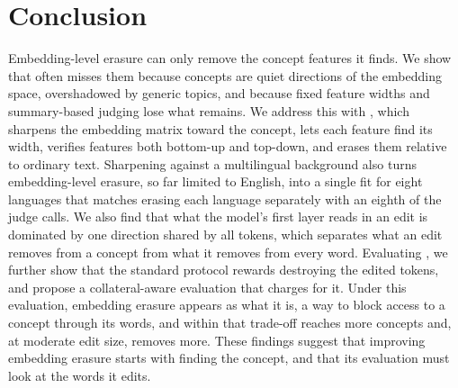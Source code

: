 \section{Conclusion}
\label{sec:conclusion}

Embedding-level erasure can only remove the concept features it finds.
We show that \ember{} often misses them because concepts are quiet directions of the embedding space, overshadowed by generic topics, and because fixed feature widths and summary-based judging lose what remains.
We address this with \cinder{}, which sharpens the embedding matrix toward the concept, lets each feature find its width, verifies features both bottom-up and top-down, and erases them relative to ordinary text.
Sharpening against a multilingual background also turns embedding-level erasure, so far limited to English, into a single fit for eight languages that matches erasing each language separately with an eighth of the judge calls.
We also find that what the model's first layer reads in an edit is dominated by one direction shared by all tokens, which separates what an edit removes from a concept from what it removes from every word.
Evaluating \cinder{}, we further show that the standard protocol rewards destroying the edited tokens, and propose a collateral-aware evaluation that charges for it.
Under this evaluation, embedding erasure appears as what it is, a way to block access to a concept through its words, and within that trade-off \cinder{} reaches more concepts and, at moderate edit size, removes more.
These findings suggest that improving embedding erasure starts with finding the concept, and that its evaluation must look at the words it edits.
